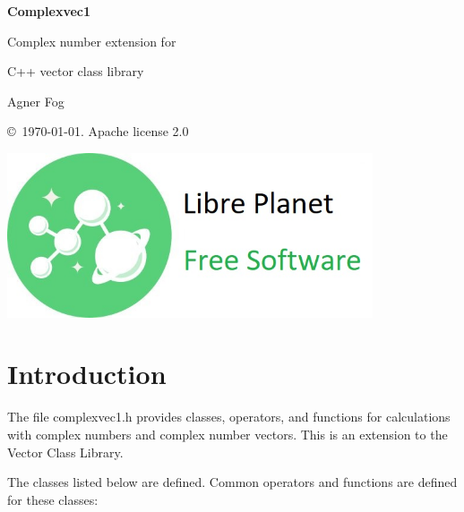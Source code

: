 \documentclass[11pt,a4paper,oneside,openright]{report}
\newcommand{\vspacesmall}{\vspace{3mm}}
\newcommand{\vspacebig}{\vspace{6mm}}
\begin{document}
\begin{titlepage}
    \centering
   
    \null %
    \vfill

   {\bfseries\Huge
    Complexvec1
    \vspacesmall
    
    Complex number extension for 
    \vspacesmall
        
    C++ vector class library 
    \vspacebig
        
   }        
    \vspacebig
    
   {\Large    
    Agner Fog
    \vspacebig
    
    \copyright\ \today. Apache license 2.0
   }
    
    \vfill
    
    \includegraphics[width=306pt]{freesoftwarelogo.jpg}
    \vfill
    
\end{titlepage}

\RaggedRight

\chapter{Introduction}\label{chap:Introduction}

The file complexvec1.h provides classes, operators, and functions for 
calculations with complex numbers and complex number vectors.
This is an extension to the Vector Class Library.
\vspacesmall

The classes listed below are defined. Common operators and functions are defined for these classes:
\end{document}
